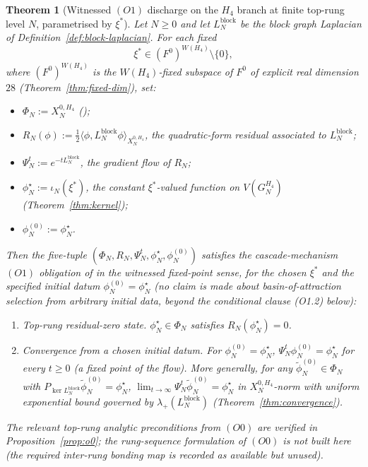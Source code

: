 \documentclass[11pt]{article}
\newtheorem{theorem}{Theorem}[section]
\theoremstyle{definition}
\begin{document}
\begin{theorem}[Witnessed $(O1)$ discharge on the $H_4$ branch at
finite top-rung level $N$, parametrised by $\xi^{*}$]
\label{thm:main}
Let $N \geq 0$ and let $L_N^{\mathrm{block}}$ be the block graph
Laplacian of Definition~\ref{def:block-laplacian}. For each
fixed
\[
  \xi^{*} \in (F^0)^{W(H_4)} \setminus \{0\},
\]
where $(F^0)^{W(H_4)}$ is the $W(H_4)$-fixed subspace of $F^0$ of
explicit real dimension $28$ (Theorem~\ref{thm:fixed-dim}), set:
\begin{itemize}
\item $\Phi_N := X_N^{0, H_4}$
  (\cite[Definition~\texttt{def:Xn-0}]{RefinementSpaces});
\item $R_N(\phi) := \tfrac{1}{2}
  \langle \phi, L_N^{\mathrm{block}} \phi \rangle_{X_N^{0, H_4}}$,
  the quadratic-form residual associated to $L_N^{\mathrm{block}}$;
\item $\Psi_N^{t} := e^{-t L_N^{\mathrm{block}}}$, the gradient
  flow of $R_N$;
\item $\phi^{\star}_{N} := \iota_N(\xi^{*})$, the constant
  $\xi^{*}$-valued function on $V(G_N^{H_4})$
  (Theorem~\ref{thm:kernel});
\item $\phi_N^{(0)} := \phi^{\star}_{N}$.
\end{itemize}
Then the five-tuple $(\Phi_N, R_N, \Psi_N^{t}, \phi^{\star}_{N},
\phi_N^{(0)})$ satisfies the cascade-mechanism $(O1)$ obligation
of \cite[\S 3.4 lines 609--617]{CascadeMechanism} \emph{in the
witnessed fixed-point sense}, for the chosen $\xi^{*}$ and the
specified initial datum $\phi_N^{(0)} = \phi^{\star}_{N}$ (no
claim is made about basin-of-attraction selection from arbitrary
initial data, beyond the conditional clause (O1.2) below):
\begin{enumerate}[label=\textup{(O1.\arabic*)}, leftmargin=3em]
\item \emph{Top-rung residual-zero state.} $\phi^{\star}_{N} \in
  \Phi_N$ satisfies $R_N(\phi^{\star}_{N}) = 0$.
\item \emph{Convergence from a chosen initial datum.} For
  $\phi_N^{(0)} = \phi^{\star}_{N}$, $\Psi_N^{t} \phi_N^{(0)} =
  \phi^{\star}_{N}$ for every $t \geq 0$ (a fixed point of the
  flow). More generally, for any $\widetilde\phi_N^{(0)} \in
  \Phi_N$ with $P_{\ker L_N^{\mathrm{block}}} \widetilde
  \phi_N^{(0)} = \phi^{\star}_{N}$,
  $\lim_{t \to \infty} \Psi_N^{t} \widetilde\phi_N^{(0)} =
  \phi^{\star}_{N}$ in $X_N^{0, H_4}$-norm with uniform
  exponential bound governed by
  $\lambda_{+}(L_N^{\mathrm{block}})$
  (Theorem~\ref{thm:convergence}).
\end{enumerate}
The relevant top-rung analytic preconditions from $(O0)$ are
verified in Proposition~\ref{prop:o0}; the rung-sequence
formulation of $(O0)$ is not built here (the required inter-rung
bonding map is recorded as available but unused).
\end{theorem}
\end{document}
